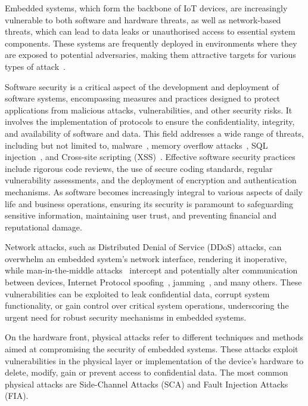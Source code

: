 Embedded systems, which form the backbone of IoT devices, are increasingly vulnerable to both software and hardware threats, as well as network-based threats, which can lead to data leaks or unauthorised access to essential system components. These systems are frequently deployed in environments where they are exposed to potential adversaries, making them attractive targets for various types of attack~\cite{MW-19-compnet, EAJJMB-22-compscrev}.

Software security is a critical aspect of the development and deployment of software systems, encompassing measures and practices designed to protect applications from malicious attacks, vulnerabilities, and other security risks. It involves the implementation of protocols to ensure the confidentiality, integrity, and availability of software and data. This field addresses a wide range of threats, including but not limited to, malware~\cite{FIMI-23-access}, memory overflow attacks~\cite{CWCBW-00-discex}, SQL injection~\cite{DGWKU-16-notere}, and Cross-site scripting (XSS)~\cite{ST-12-computer}. Effective software security practices include rigorous code reviews, the use of secure coding standards, regular vulnerability assessments, and the deployment of encryption and authentication mechanisms. As software becomes increasingly integral to various aspects of daily life and business operations, ensuring its security is paramount to safeguarding sensitive information, maintaining user trust, and preventing financial and reputational damage.

Network attacks, such as Distributed Denial of Service (DDoS) attacks, can overwhelm an embedded system's network interface, rendering it inoperative, while man-in-the-middle attacks~\cite{CDL-16-commsurtuto} intercept and potentially alter communication between devices, Internet Protocol spoofing~\cite{MRT-10-isf}, jamming~\cite{PZ-22-commsurtuto}, and many others. These vulnerabilities can be exploited to leak confidential data, corrupt system functionality, or gain control over critical system operations, underscoring the urgent need for robust security mechanisms in embedded systems.

On the hardware front, physical attacks refer to different techniques and methods aimed at compromising the security of embedded systems. These attacks exploit vulnerabilities in the physical layer or implementation of the device’s hardware to delete, modify, gain or prevent access to confidential data.
The most common physical attacks are Side-Channel Attacks (SCA) and Fault Injection Attacks (FIA).

